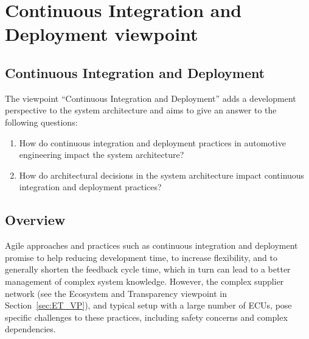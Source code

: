 
\section{Continuous Integration and Deployment viewpoint}\label{sec:CID_VP}
\renewcommand{\Fillin}[1]{{Continuous Integration and Deployment}}
\subsection{\Fillin{Viewpoint Name}}\label{vp:template}



The viewpoint ``Continuous Integration and Deployment'' adds a development perspective to the system %
architecture and aims to give an answer to the following questions:
\begin{enumerate}
\item How do continuous integration and deployment practices in automotive engineering impact the system architecture?
\item How do architectural decisions in the system architecture impact continuous integration and deployment practices?
\end{enumerate}

\subsection{Overview} 

Agile approaches and practices such as continuous integration and deployment promise to help reducing development time, to increase flexibility, and to generally shorten the feedback cycle time, which in turn can lead to a better management of complex system knowledge. 
However, the  complex supplier network (see the Ecosystem and Transparency viewpoint in Section~\ref{sec:ET_VP}),
and typical setup with a large number of ECUs,
pose specific challenges to %
these practices, including safety concerns and complex dependencies. %

